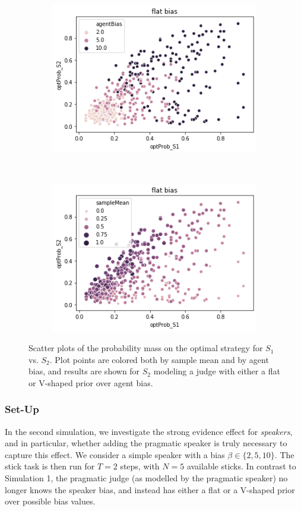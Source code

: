 \documentclass[10pt,letterpaper]{article}
\begin{document}
\begin{figure}[h]
\begin{subfigure}{0.45\textwidth}
	\includegraphics[width=\textwidth]{figures/seeFlatBias.png}
\end{subfigure}
~
\begin{subfigure}{0.45\textwidth}
	\includegraphics[width=\textwidth]{figures/seeFlatMean.png}
\end{subfigure}
\caption{Scatter plots of the probability mass on the optimal strategy for $S_1$ vs. $S_2$. Plot points are colored
both by sample mean and by agent bias, and results are shown for $S_2$ modeling a judge with either a flat or 
V-shaped prior over agent bias.} 
\label{fig:seeSpeaker}
\end{figure}

\subsubsection{Set-Up}
In the second simulation, we investigate the strong evidence effect for \textit{speakers}, and in particular, whether adding the 
pragmatic speaker is truly necessary to capture this effect. We consider a simple speaker with a bias $\beta\in\{2, 5, 10\}$.
The stick task is then run for $T=2$ steps, with $N=5$ available sticks. In contrast to Simulation 1, the pragmatic judge 
(as modelled by the pragmatic speaker) no longer knows the speaker bias, and instead has either a flat or a V-shaped prior over possible bias values.
\end{document}
